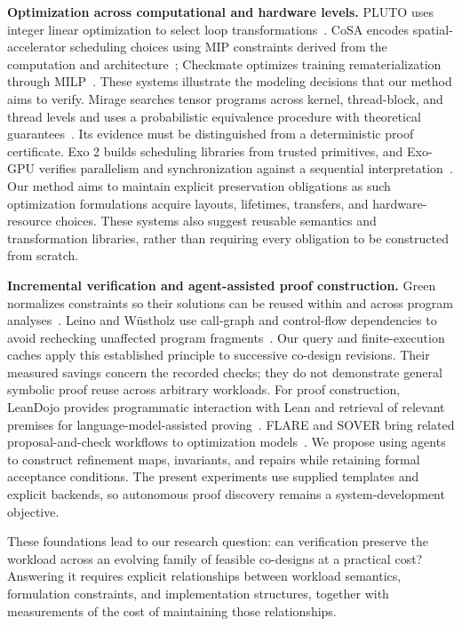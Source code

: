 \documentclass[11pt]{article}
\begin{document}
\textbf{Optimization across computational and hardware levels.}
PLUTO uses integer linear optimization to select loop transformations~\cite{pluto}. CoSA encodes spatial-accelerator scheduling choices using MIP constraints derived from the computation and architecture~\cite{cosa}; Checkmate optimizes training rematerialization through MILP~\cite{checkmate}. These systems illustrate the modeling decisions that our method aims to verify. Mirage searches tensor programs across kernel, thread-block, and thread levels and uses a probabilistic equivalence procedure with theoretical guarantees~\cite{mirage}. Its evidence must be distinguished from a deterministic proof certificate. Exo 2 builds scheduling libraries from trusted primitives, and Exo-GPU verifies parallelism and synchronization against a sequential interpretation~\cite{exo2,exogpu}. Our method aims to maintain explicit preservation obligations as such optimization formulations acquire layouts, lifetimes, transfers, and hardware-resource choices. These systems also suggest reusable semantics and transformation libraries, rather than requiring every obligation to be constructed from scratch.

\textbf{Incremental verification and agent-assisted proof construction.}
Green normalizes constraints so their solutions can be reused within and across program analyses~\cite{green}. Leino and W\"ustholz use call-graph and control-flow dependencies to avoid rechecking unaffected program fragments~\cite{incremental}. Our query and finite-execution caches apply this established principle to successive co-design revisions. Their measured savings concern the recorded checks; they do not demonstrate general symbolic proof reuse across arbitrary workloads. For proof construction, LeanDojo provides programmatic interaction with Lean and retrieval of relevant premises for language-model-assisted proving~\cite{leandojo}. FLARE and SOVER bring related proposal-and-check workflows to optimization models~\cite{flare,sover}. We propose using agents to construct refinement maps, invariants, and repairs while retaining formal acceptance conditions. The present experiments use supplied templates and explicit backends, so autonomous proof discovery remains a system-development objective.

These foundations lead to our research question: can verification preserve the workload across an evolving family of feasible co-designs at a practical cost? Answering it requires explicit relationships between workload semantics, formulation constraints, and implementation structures, together with measurements of the cost of maintaining those relationships.
\end{document}
